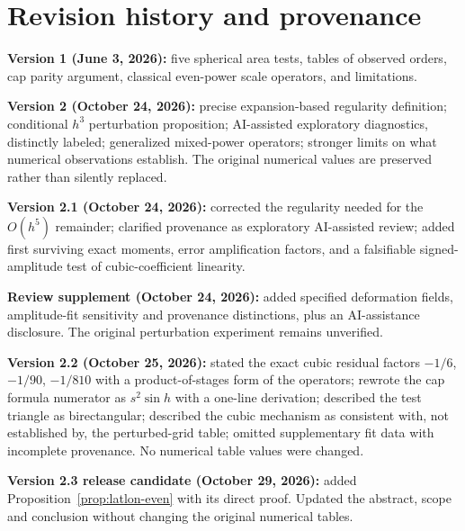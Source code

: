 \documentclass[11pt]{article}
\theoremstyle{remark}
\begin{document}
\section{Revision history and provenance}
\textbf{Version 1 (June 3, 2026):} five spherical area tests, tables of observed orders, cap
parity argument, classical even-power scale operators, and limitations.

\textbf{Version 2 (October 24, 2026):} precise expansion-based regularity definition;
conditional $h^3$ perturbation proposition; AI-assisted exploratory diagnostics, distinctly
labeled; generalized mixed-power operators; stronger limits on what numerical observations
establish. The original numerical values are preserved rather than silently replaced.

\textbf{Version 2.1 (October 24, 2026):} corrected the regularity needed for the $O(h^5)$
remainder; clarified provenance as exploratory AI-assisted review; added first surviving exact
moments, error amplification factors, and a falsifiable signed-amplitude test of
cubic-coefficient linearity.

\textbf{Review supplement (October 24, 2026):} added specified deformation fields,
amplitude-fit sensitivity and provenance distinctions, plus an AI-assistance disclosure. The
original perturbation experiment remains unverified.

\textbf{Version 2.2 (October 25, 2026):} stated the exact cubic residual factors $-1/6$,
$-1/90$, $-1/810$ with a product-of-stages form of the operators; rewrote the cap formula
numerator as $s^2\sin h$ with a one-line derivation; described the test triangle as
birectangular; described the cubic mechanism as consistent with, not established by, the
perturbed-grid table; omitted supplementary fit data with incomplete provenance. No numerical
table values were changed.

\textbf{Version 2.3 release candidate (October 29, 2026):} added
Proposition~\ref{prop:latlon-even} with its direct proof. Updated the abstract, scope and
conclusion without changing the original numerical tables.
\end{document}
